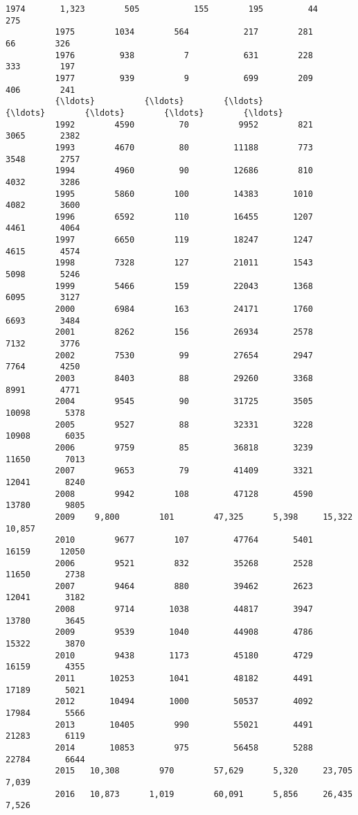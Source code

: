 \documentclass[11pt]{article}
\begin{document}
\begin{Verbatim}[commandchars=\\\{\}]
          1974       1,323        505           155        195         44        275   
          1975        1034        564           217        281         66        326   
          1976         938          7           631        228        333        197   
          1977         939          9           699        209        406        241   
          {\ldots}          {\ldots}        {\ldots}           {\ldots}        {\ldots}        {\ldots}        {\ldots}   
          1992        4590         70          9952        821       3065       2382   
          1993        4670         80         11188        773       3548       2757   
          1994        4960         90         12686        810       4032       3286   
          1995        5860        100         14383       1010       4082       3600   
          1996        6592        110         16455       1207       4461       4064   
          1997        6650        119         18247       1247       4615       4574   
          1998        7328        127         21011       1543       5098       5246   
          1999        5466        159         22043       1368       6095       3127   
          2000        6984        163         24171       1760       6693       3484   
          2001        8262        156         26934       2578       7132       3776   
          2002        7530         99         27654       2947       7764       4250   
          2003        8403         88         29260       3368       8991       4771   
          2004        9545         90         31725       3505      10098       5378   
          2005        9527         88         32331       3228      10908       6035   
          2006        9759         85         36818       3239      11650       7013   
          2007        9653         79         41409       3321      12041       8240   
          2008        9942        108         47128       4590      13780       9805   
          2009    9,800        101        47,325      5,398     15,322     10,857      
          2010        9677        107         47764       5401      16159      12050   
          2006        9521        832         35268       2528      11650       2738   
          2007        9464        880         39462       2623      12041       3182   
          2008        9714       1038         44817       3947      13780       3645   
          2009        9539       1040         44908       4786      15322       3870   
          2010        9438       1173         45180       4729      16159       4355   
          2011       10253       1041         48182       4491      17189       5021   
          2012       10494       1000         50537       4092      17984       5566   
          2013       10405        990         55021       4491      21283       6119   
          2014       10853        975         56458       5288      22784       6644   
          2015   10,308        970        57,629      5,320     23,705      7,039      
          2016   10,873      1,019        60,091      5,856     26,435      7,526      
          

\end{Verbatim}
\end{document}
